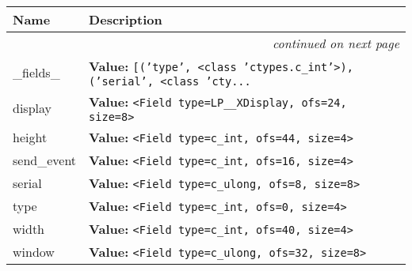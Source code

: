    \vspace{-1cm}
\hspace{\varindent}\begin{longtable}{|p{\varnamewidth}|p{\vardescrwidth}|l}
\cline{1-2}
\cline{1-2} \centering \textbf{Name} & \centering \textbf{Description}& \\
\cline{1-2}
\endhead\cline{1-2}\multicolumn{3}{r}{\small\textit{continued on next page}}\\\endfoot\cline{1-2}
\endlastfoot\raggedright \_\-f\-i\-e\-l\-d\-s\-\_\- & \raggedright \textbf{Value:} 
{\tt \texttt{[}\texttt{(}\texttt{'}\texttt{type}\texttt{'}\texttt{, }{\textless}class 'ctypes.c\_int'{\textgreater}\texttt{)}\texttt{, }\texttt{(}\texttt{'}\texttt{serial}\texttt{'}\texttt{, }{\textless}class 'cty\texttt{...}}&\\
\cline{1-2}
\raggedright d\-i\-s\-p\-l\-a\-y\- & \raggedright \textbf{Value:} 
{\tt {\textless}Field type=LP\_\_XDisplay, ofs=24, size=8{\textgreater}}&\\
\cline{1-2}
\raggedright h\-e\-i\-g\-h\-t\- & \raggedright \textbf{Value:} 
{\tt {\textless}Field type=c\_int, ofs=44, size=4{\textgreater}}&\\
\cline{1-2}
\raggedright s\-e\-n\-d\-\_\-e\-v\-e\-n\-t\- & \raggedright \textbf{Value:} 
{\tt {\textless}Field type=c\_int, ofs=16, size=4{\textgreater}}&\\
\cline{1-2}
\raggedright s\-e\-r\-i\-a\-l\- & \raggedright \textbf{Value:} 
{\tt {\textless}Field type=c\_ulong, ofs=8, size=8{\textgreater}}&\\
\cline{1-2}
\raggedright t\-y\-p\-e\- & \raggedright \textbf{Value:} 
{\tt {\textless}Field type=c\_int, ofs=0, size=4{\textgreater}}&\\
\cline{1-2}
\raggedright w\-i\-d\-t\-h\- & \raggedright \textbf{Value:} 
{\tt {\textless}Field type=c\_int, ofs=40, size=4{\textgreater}}&\\
\cline{1-2}
\raggedright w\-i\-n\-d\-o\-w\- & \raggedright \textbf{Value:} 
{\tt {\textless}Field type=c\_ulong, ofs=32, size=8{\textgreater}}&\\
\cline{1-2}
\end{longtable}



